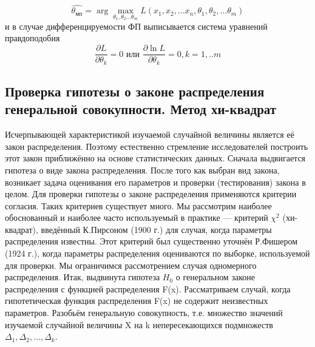 \begin{equation}
\hat{\theta_{мп}} = \arg \max_{\theta_{1}, \theta_{2}...\theta_{m}} L(x_{1}, x_{2},...x_{n}, \theta_{1}, \theta_{2},...\theta_{m})
\label{multi_theta}
\end{equation}
и в случае дифференцируемости ФП выписывается система уравнений правдоподобия
\begin{equation}
\frac{\partial L}{\partial \theta_{k}} = 0 \text{  или  } \frac{\partial \ln L}{\partial \theta_{k}} = 0, k = 1,..m
\end{equation}





\subsection{Проверка гипотезы о законе распределения генеральной совокупности. Метод хи-квадрат}
Исчерпывающей характеристикой изучаемой случайной величины является её закон распределения. Поэтому естественно стремление исследователей построить этот закон приближённо на основе статистических данных.
\newline
Сначала выдвигается гипотеза о виде закона распределения.
\newline
После того как выбран вид закона, возникает задача оценивания его параметров и проверки (тестирования) закона в целом.
\newline
Для проверки гипотезы о законе распределения применяются критерии согласия. Таких критериев существует много. Мы рассмотрим наиболее обоснованный и наиболее часто используемый в практике — критерий $\chi^{2}$ (хи-квадрат), введённый К.Пирсоном (1900 г.) для случая, когда параметры распределения известны. Этот критерий был существенно уточнён Р.Фишером (1924 г.), когда параметры распределения оцениваются по выборке, используемой для проверки.
\newline
Мы ограничимся рассмотрением случая одномерного распределения.
\newline
Итак, выдвинута гипотеза $H_{0}$ о генеральном законе распределения с функцией распределения F(x).
\newline
Рассматриваем случай, когда гипотетическая функция распределения F(x) не содержит неизвестных параметров.
\newline
Разобьём генеральную совокупность, т.е. множество значений изучаемой случайной величины X на k непересекающихся подмножеств $\Delta_{1},\Delta_{2}, ... ,\Delta_{k}$.
\newline
